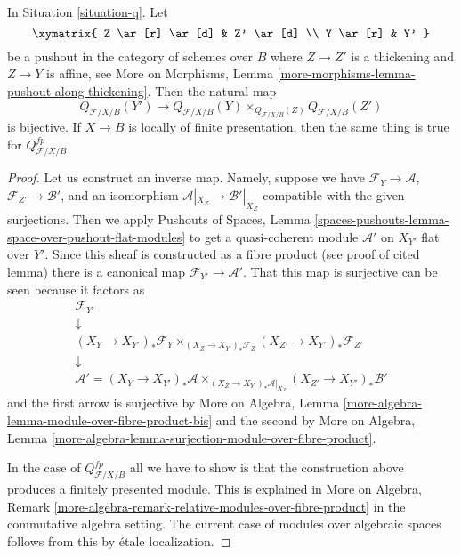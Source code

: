 \begin{lemma}
\label{lemma-q-RS-star}
In Situation \ref{situation-q}. Let
$$
\xymatrix{
Z \ar[r] \ar[d] & Z' \ar[d] \\
Y \ar[r] & Y'
}
$$
be a pushout in the category of schemes over $B$ where
$Z \to Z'$ is a thickening and $Z \to Y$ is affine, see
More on Morphisms, Lemma \ref{more-morphisms-lemma-pushout-along-thickening}.
Then the natural map
$$
Q_{\mathcal{F}/X/B}(Y') \longrightarrow
Q_{\mathcal{F}/X/B}(Y) \times_{Q_{\mathcal{F}/X/B}(Z)} Q_{\mathcal{F}/X/B}(Z')
$$
is bijective. If $X \to B$ is locally of finite presentation, then
the same thing is true for $Q^{fp}_{\mathcal{F}/X/B}$.
\end{lemma}

\begin{proof}
Let us construct an inverse map. Namely, suppose we have
$\mathcal{F}_Y \to \mathcal{A}$,
$\mathcal{F}_{Z'} \to \mathcal{B}'$, and an isomorphism
$\mathcal{A}|_{X_Z} \to \mathcal{B}'|_{X_Z}$
compatible with the given surjections.
Then we apply Pushouts of Spaces, Lemma
\ref{spaces-pushouts-lemma-space-over-pushout-flat-modules}
to get a quasi-coherent module $\mathcal{A}'$ on $X_{Y'}$
flat over $Y'$. Since this sheaf is constructed as a fibre product
(see proof of cited lemma) there is a canonical map
$\mathcal{F}_{Y'} \to \mathcal{A}'$. That this map is surjective
can be seen because it factors as
$$
\begin{matrix}
\mathcal{F}_{Y'} \\
\downarrow \\
(X_Y \to X_{Y'})_*\mathcal{F}_Y
\times_{(X_Z \to X_{Y'})_*\mathcal{F}_Z}
(X_{Z'} \to X_{Y'})_*\mathcal{F}_{Z'} \\
\downarrow \\
\mathcal{A}' =
(X_Y \to X_{Y'})_*\mathcal{A}
\times_{(X_Z \to X_{Y'})_*\mathcal{A}|_{X_Z}}
(X_{Z'} \to X_{Y'})_*\mathcal{B}'
\end{matrix}
$$
and the first arrow is surjective by
More on Algebra, Lemma \ref{more-algebra-lemma-module-over-fibre-product-bis}
and the second by
More on Algebra, Lemma
\ref{more-algebra-lemma-surjection-module-over-fibre-product}.

\medskip\noindent
In the case of $Q^{fp}_{\mathcal{F}/X/B}$ all we have to show is that
the construction above produces a finitely presented module.
This is explained in
More on Algebra, Remark
\ref{more-algebra-remark-relative-modules-over-fibre-product}
in the commutative algebra setting. The current case of modules
over algebraic spaces follows from this
by \'etale localization.
\end{proof}







